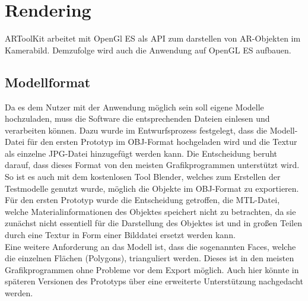 \section{Rendering}
ARToolKit arbeitet mit OpenGl ES als API zum darstellen von AR-Objekten im Kamerabild. Demzufolge wird auch die Anwendung auf OpenGL ES aufbauen. 

\subsection{Modellformat}
Da es dem Nutzer mit der Anwendung möglich sein soll eigene Modelle hochzuladen, muss die Software die entsprechenden Dateien einlesen und verarbeiten können. Dazu wurde im Entwurfsprozess festgelegt, dass die Modell-Datei für den ersten Prototyp im OBJ-Format hochgeladen wird und die Textur als einzelne JPG-Datei hinzugefügt werden kann. Die Entscheidung beruht darauf, dass dieses Format von den meisten Grafikprogrammen unterstützt wird. So ist es auch mit dem kostenlosen Tool Blender, welches zum Erstellen der Testmodelle genutzt wurde, möglich die Objekte im OBJ-Format zu exportieren.\\
Für den ersten Prototyp wurde die Entscheidung getroffen, die MTL-Datei, welche Materialinformationen des Objektes speichert nicht zu betrachten, da sie zunächst nicht essentiell für die Darstellung des Objektes ist und in großen Teilen durch eine Textur in Form einer Bilddatei ersetzt werden kann.\\
Eine weitere Anforderung an das Modell ist, dass die sogenannten Faces, welche die einzelnen Flächen (Polygons), trianguliert werden. Dieses ist in den meisten Grafikprogrammen ohne Probleme vor dem Export möglich. Auch hier könnte in späteren Versionen des Prototyps über eine erweiterte Unterstützung nachgedacht werden.

